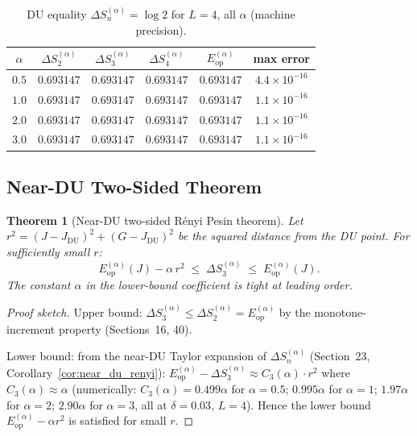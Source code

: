 \documentclass[12pt,a4paper]{article}
\newtheorem{theorem}{Theorem}[section]
\begin{document}
\begin{table}[h]
\centering
\caption{DU equality $\Delta S_n^{(\alpha)} = \log 2$ for $L=4$, all $\alpha$ (machine precision).}
\label{tab:du_equality}
\begin{tabular}{c|cccc|c}
\hline
$\alpha$ & $\Delta S_2^{(\alpha)}$ & $\Delta S_3^{(\alpha)}$ & $\Delta S_4^{(\alpha)}$ &
$E_\mathrm{op}^{(\alpha)}$ & max error \\
\hline
$0.5$ & $0.693147$ & $0.693147$ & $0.693147$ & $0.693147$ & $4.4\times10^{-16}$ \\
$1.0$ & $0.693147$ & $0.693147$ & $0.693147$ & $0.693147$ & $1.1\times10^{-16}$ \\
$2.0$ & $0.693147$ & $0.693147$ & $0.693147$ & $0.693147$ & $1.1\times10^{-16}$ \\
$3.0$ & $0.693147$ & $0.693147$ & $0.693147$ & $0.693147$ & $1.1\times10^{-16}$ \\
\hline
\end{tabular}
\end{table}

\subsection{Near-DU Two-Sided Theorem}
\label{subsec:twosided_nearDU}

\begin{theorem}[Near-DU two-sided Rényi Pesin theorem]\label{thm:two_sided_pesin}
Let $r^2 = (J-J_\mathrm{DU})^2+(G-J_\mathrm{DU})^2$ be the squared distance
from the DU point.  For sufficiently small $r$:
\[
  \boxed{E_\mathrm{op}^{(\alpha)}(J) - \alpha\, r^2
  \;\leq\; \Delta S_3^{(\alpha)}
  \;\leq\; E_\mathrm{op}^{(\alpha)}(J).}
\]
The constant $\alpha$ in the lower-bound coefficient is tight at leading order.
\end{theorem}

\begin{proof}[Proof sketch]
Upper bound: $\Delta S_3^{(\alpha)}\leq\Delta S_2^{(\alpha)}=E_\mathrm{op}^{(\alpha)}$
by the monotone-increment property (Sections~16, 40).

Lower bound: from the near-DU Taylor expansion of $\Delta S_n^{(\alpha)}$
(Section~23, Corollary~\ref{cor:near_du_renyi}):
$E_\mathrm{op}^{(\alpha)}-\Delta S_3^{(\alpha)}\approx C_3(\alpha)\cdot r^2$
where $C_3(\alpha)\approx\alpha$ (numerically: $C_3(\alpha)=0.499\alpha$ for $\alpha=0.5$;
$0.995\alpha$ for $\alpha=1$; $1.97\alpha$ for $\alpha=2$; $2.90\alpha$ for $\alpha=3$,
all at $\delta=0.03$, $L=4$).
Hence the lower bound $E_\mathrm{op}^{(\alpha)}-\alpha r^2$ is satisfied for small $r$.
\end{proof}
\end{document}
